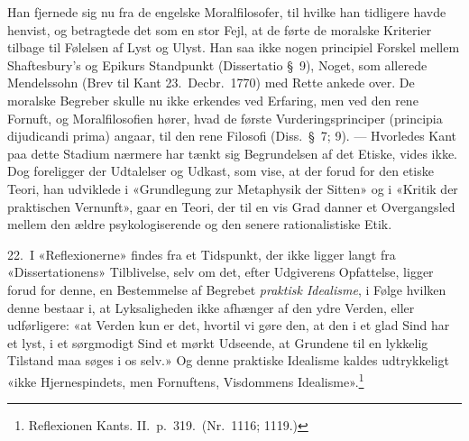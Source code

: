 \documentclass[12pt,a4paper]{article}
\newcommand{\apage}[1]{\marginnote{\footnotesize\textit{[#1]}}}
\begin{document}
Han fjernede sig nu fra de engelske Moralfilosofer, til hvilke han
tidligere havde henvist, og betragtede det som en stor Fejl, at de førte
de moralske Kriterier tilbage til Følelsen af Lyst og Ulyst. Han saa ikke
nogen principiel Forskel mellem Shaftesbury's og Epikurs Standpunkt
(Dissertatio §\ 9), Noget, som allerede Mendelssohn (Brev til Kant 23.\
Decbr.\ 1770) med Rette ankede over. De moralske Begreber skulle nu ikke
erkendes \apage{42}  ved Erfaring, men ved den rene Fornuft, og Moralfilosofien
hører, hvad de første Vurderingsprinciper (principia dijudicandi
prima) angaar, til den rene Filosofi (Diss.\ §\ 7; 9). --- Hvorledes
Kant paa dette Stadium nærmere har tænkt sig Begrundelsen af det Etiske,
vides ikke. Dog foreligger der Udtalelser og Udkast, som vise, at der
forud for den etiske Teori, han udviklede i «Grundlegung zur Metaphysik
der Sitten» og i «Kritik der praktischen Vernunft», gaar en Teori, der
til en vis Grad danner et Overgangsled mellem den ældre psykologiserende
og den senere rationalistiske Etik.

22.\ I «Reflexionerne» findes fra et Tidspunkt, der ikke ligger langt fra
«Dissertationens» Tilblivelse, selv om det, efter Udgiverens Opfattelse,
ligger forud for denne, en Bestemmelse af Begrebet \emph{praktisk Idealisme}, i
Følge hvilken denne bestaar i, at Lyksaligheden ikke afhænger af den ydre
Verden, eller udførligere: «at Verden kun er det, hvortil vi gøre den, at
den i et glad Sind har et lyst, i et sørgmodigt Sind et mørkt Udseende,
at Grundene til en lykkelig Tilstand maa søges i os selv.» Og denne
praktiske Idealisme kaldes udtrykkeligt «ikke Hjernespindets, men
Fornuftens, Visdommens Idealisme».\footnote{Reflexionen Kants.
II.\ p.\ 319.\ (Nr.\ 1116; 1119.)}
\end{document}
